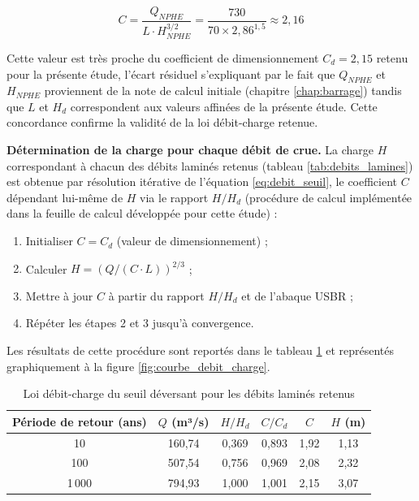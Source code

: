 \begin{equation}
C = \frac{Q_{NPHE}}{L \cdot H_{NPHE}^{3/2}} = \frac{730}{70 \times 2{,}86^{1,5}} \approx 2{,}16
\label{eq:coeff_debit_verif}
\end{equation}

Cette valeur est très proche du coefficient de dimensionnement $C_d = 2{,}15$ retenu pour la présente étude, l'écart résiduel s'expliquant par le fait que $Q_{NPHE}$ et $H_{NPHE}$ proviennent de la note de calcul initiale (chapitre \ref{chap:barrage}) tandis que $L$ et $H_d$ correspondent aux valeurs affinées de la présente étude. Cette concordance confirme la validité de la loi débit-charge retenue.

\textbf{Détermination de la charge pour chaque débit de crue.} La charge $H$ correspondant à chacun des débits laminés retenus (tableau \ref{tab:debits_lamines}) est obtenue par résolution itérative de l'équation \ref{eq:debit_seuil}, le coefficient $C$ dépendant lui-même de $H$ via le rapport $H/H_d$ (procédure de calcul implémentée dans la feuille de calcul développée pour cette étude) :
\begin{enumerate}
    \item Initialiser $C = C_d$ (valeur de dimensionnement) ;
    \item Calculer $H = (Q / (C \cdot L))^{2/3}$ ;
    \item Mettre à jour $C$ à partir du rapport $H/H_d$ et de l'abaque USBR ;
    \item Répéter les étapes 2 et 3 jusqu'à convergence.
\end{enumerate}

Les résultats de cette procédure sont reportés dans le tableau \ref{tab:loi_debit_charge} et représentés graphiquement à la figure \ref{fig:courbe_debit_charge}.

\begin{table}[H]
    \centering
    \caption{Loi débit-charge du seuil déversant pour les débits laminés retenus}
    \label{tab:loi_debit_charge}
    \begin{tabular}{|c|c|c|c|c|c|}
        \hline
        \textbf{Période de retour (ans)} & \textbf{$Q$ (m³/s)} & \textbf{$H/H_d$} & \textbf{$C/C_d$} & \textbf{$C$} & \textbf{$H$ (m)} \\
        \hline
        10 & 160,74 & 0,369 & 0,893 & 1,92 & 1,13 \\
        \hline
        100 & 507,54 & 0,756 & 0,969 & 2,08 & 2,32 \\
        \hline
        1\,000 & 794,93 & 1,000 & 1,001 & 2,15 & 3,07 \\
        \hline
    \end{tabular}
\end{table}

